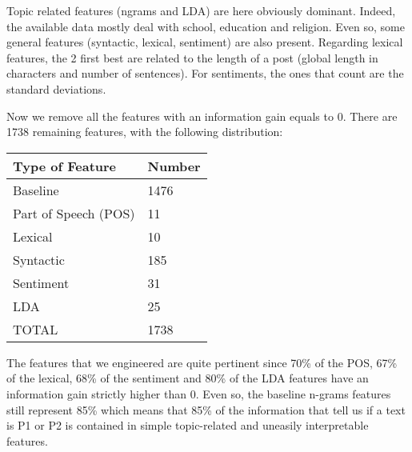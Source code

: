 Topic related features (ngrams and LDA) are here obviously dominant. Indeed, the available data mostly deal with school, education and religion. Even so, some general features (syntactic, lexical, sentiment) are also present. Regarding lexical features, the 2 first best are related to the length of a post (global length in characters and number of sentences). For sentiments, the ones that count are the standard deviations.

Now we remove all the features with an information gain equals to 0. There are 1738 remaining features, with the following distribution:
\\
\begin{table}[H]
\centering
\begin{tabular}{|l|l|}
\hline
Type of Feature      & Number \\ \hline
Baseline             & 1476  \\ \hline
Part of Speech (POS) & 11     \\ \hline
Lexical              & 10     \\ \hline
Syntactic            & 185   \\ \hline
Sentiment            & 31     \\ \hline
LDA                  & 25     \\ \hline
\rowcolor[HTML]{C0C0C0} 
TOTAL                & 1738  \\ \hline
\end{tabular}
\end{table}

The features that we engineered are quite pertinent since 70\% of the POS, 67\% of the lexical, 68\% of the sentiment and 80\% of the LDA features have an information gain strictly higher than 0. Even so, the baseline n-grams features still represent 85\% which means that 85\% of the information that tell us if a text is P1 or P2 is contained in simple topic-related and uneasily interpretable features.


